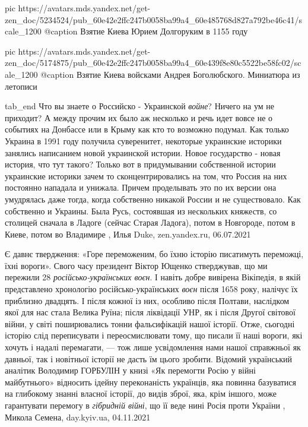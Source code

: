      pic https://avatars.mds.yandex.net/get-zen_doc/5234524/pub_60e42e2ffc247b0058ba99a4_60e485768d827a792be46c41/scale_1200
		 @caption Взятие Киева Юрием Долгоруким в 1155 году

     pic https://avatars.mds.yandex.net/get-zen_doc/5174875/pub_60e42e2ffc247b0058ba99a4_60e439f8e80c5522be58fc02/scale_1200
		 @caption Взятие Киева войсками Андрея Боголюбского. Миниатюра из летописи

  tab_end
\fi
Что вы знаете о Российско - Украинской \emph{войне}? Ничего на ум не приходит?
А между прочим их было аж несколько и речь идет вовсе не о событиях на Донбассе
или в Крыму как кто то возможно подумал. Как только Украина в 1991 году
получила суверенитет, некоторые украинские историки занялись написанием новой
украинской истории. Новое государство - новая история, что тут такого? Только
вот в придумывании собственной истории украинские историки зачем то
сконцентрировались на том, что Россия на них постоянно нападала и унижала.
Причем проделывать это по их версии она умудрялась даже тогда, когда собственно
никакой России и не существовало. Как собственно и Украины. Была Русь,
состоявшая из нескольких княжеств, со столицей сначала в Ладоге (сейчас Старая
Ладога), потом в Новгороде, потом в Киеве, потом во Владимире
, Илья Duke, zen.yandex.ru, 06.07.2021

Є давнє твердження: «Горе переможеним, бо їхню історію писатимуть переможці,
їхні вороги». Свого часу президент Віктор Ющенко стверджував, що ми пережили 28
\emph{російсько-українських воєн}. І навіть добре вивірена Вікіпедія, в якій
представлено хронологію російсько-українських \emph{воєн} після 1658 року, налічує їх
приблизно двадцять. І після кожної із них, особливо після Полтави, наслідком
якої для нас стала Велика Руїна; після ліквідації УНР, як і після Другої
світової війни, у світі поширювались тонни фальсифікацій нашої історії. Отже,
сьогодні історію слід переписувати і переосмислювати тому, що писали її наші
вороги, які хочуть і надалі перемагати, — тож лише усвідомлення нами нашої
справжньої як давньої, так і новітньої історії не дасть їм цього зробити.
Відомий український аналітик Володимир ГОРБУЛІН у книзі «Як перемогти Росію у
війні майбутнього» відносить ідейну переконаність українців, яка повинна
базуватися на глибокому знанні власної історії, до видів зброї, яка, крім
іншого, може гарантувати перемогу в \emph{гібридній війні}, що її веде нині Росія
проти України
, Микола Семена, day.kyiv.ua, 04.11.2021

